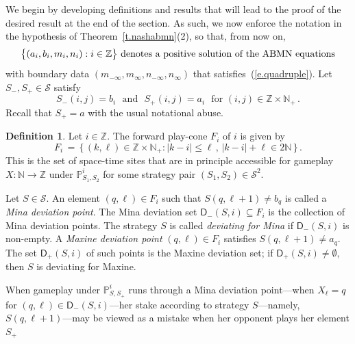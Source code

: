 \documentclass[letterpaper,11pt,oneside,reqno]{amsbook}
\newcommand{\PP}{\ensuremath{\mathbb{P}}}
\newcommand{\N}{\ensuremath{\mathbb{N}}}
\newcommand{\Z}{\ensuremath{\mathbb{Z}}}
\numberwithin{figure}{chapter}
\theoremstyle{definition}
\theoremstyle{definition}
\theoremstyle{definition}
\newtheorem{definition}[theorem]{Definition}
\theoremstyle{definition}
\theoremstyle{definition}
\newcommand{\mc}{\mathcal}
\newcommand{\nwithzero}{\N}
\newcommand{\nwithoutzero}{\N_+}
\newcommand\pgameplay[3]{\PP^{#3}_{#1,#2}}
\newcommand{\abmnmacspace}{\textrm{ABMN} }
\begin{document}
We begin by developing definitions and results that will lead to the proof of the desired result at the end of the section.
As such, we now enforce the notation in the hypothesis of Theorem~\ref{t.nashabmn}(2), so that, from now on, 
$$
\text{$\big\{ (a_i,b_i,m_i,n_i) : i \in \Z \big\}$ denotes a positive 
solution of the \abmnmacspace equations}
$$ 
with boundary data $(m_{-\infty},m_\infty,n_{-\infty},n_\infty)$ that satisfies~(\ref{e.quadruple}).
Let $S_-,S_+ \in \mc{S}$ satisfy
\begin{equation}\label{e.ba}
 S_-(i,j) = b_i \, \, \,\,\textrm{and} \, \, \, \, S_+(i,j) = a_i \, \, \, \, \textrm{for $(i,j) \in \Z \times \nwithoutzero$}
 \, .
\end{equation}
Recall that $S_+ = a$ with the usual notational abuse.
\begin{definition}\label{d.mds}
Let $i \in \Z$. The forward play-cone $F_i$ of $i$ is given by 
$$
F_i \, = \, \Big\{ \, (k,\ell) \in \Z \times \nwithoutzero: \vert k - i \vert \leq \ell \, , \, \vert k-i \vert + \ell  \in 2\nwithzero \, \Big\} \, .
$$
This is the set of space-time sites that are in principle accessible for gameplay $X:\nwithzero \to \Z$ under $\pgameplay{S_1}{S_2}{i}$ for some strategy pair $(S_1,S_2) \in \mc{S}^2$.


Let $S \in \mc{S}$. An element $(q,\ell) \in F_i$ such that  $S(q,\ell+1) \not= b_q$ is called a {\em Mina deviation point}. 
The Mina deviation set $\mathsf{D}_-(S,i) \subseteq F_i$ is the collection of Mina deviation points. The strategy $S$ is called {\em deviating for Mina} if  $\mathsf{D}_-(S,i)$ is non-empty.
 A {\em Maxine deviation point} $(q,\ell) \in F_i$ satisfies  $S(q,\ell+1) \not= a_q$. The set $\mathsf{D}_+(S,i)$ of such points is the Maxine deviation set; if  $\mathsf{D}_+(S,i) \not= \emptyset$, then $S$ is deviating for Maxine.  
\end{definition}
When gameplay under $\pgameplay{S}{S_+}{i}$ runs through a Mina deviation point---when $X_\ell = q$ for $(q,\ell) \in \mathsf{D}_-(S,i)$---her stake according to strategy $S$---namely, $S(q,\ell+1)$---may be viewed as a mistake when her opponent plays her element $S_+$
\end{document}
